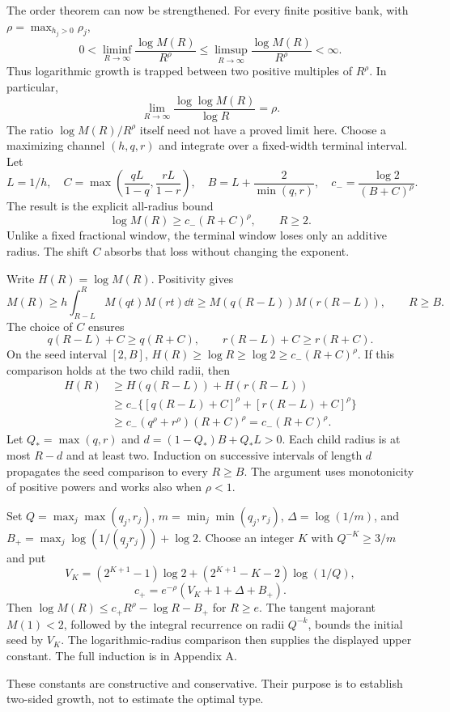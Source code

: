 The order theorem can now be strengthened. For every finite positive bank,
with $\rho=\max_{h_j>0}\rho_j$,
\[
\boxed{0<\liminf_{R\to\infty}\frac{\log M(R)}{R^\rho}
\le\limsup_{R\to\infty}\frac{\log M(R)}{R^\rho}<\infty.}
\]
Thus logarithmic growth is trapped between two positive multiples of
$R^\rho$. In particular,
\[
\lim_{R\to\infty}\frac{\log\log M(R)}{\log R}=\rho.
\]
The ratio $\log M(R)/R^\rho$ itself need not have a proved limit here.
Choose a maximizing channel $(h,q,r)$ and integrate over a fixed-width
terminal interval. Let
\[
L=1/h,\quad C=\max\left(\frac{qL}{1-q},\frac{rL}{1-r}\right),\quad
B=L+\frac{2}{\min(q,r)},\quad c_-=\frac{\log2}{(B+C)^\rho}.
\]
The result is the explicit all-radius bound
\[
\log M(R)\ge c_-(R+C)^\rho,\qquad R\ge2.
\]
Unlike a fixed fractional window, the terminal window loses only an additive
radius. The shift $C$ absorbs that loss without changing the exponent.

Write $H(R)=\log M(R)$. Positivity gives
\[
M(R)\ge h\int_{R-L}^{R}M(qt)M(rt)\dd t
\ge M(q(R-L))M(r(R-L)),\qquad R\ge B.
\]
The choice of $C$ ensures
\[
q(R-L)+C\ge q(R+C),\qquad r(R-L)+C\ge r(R+C).
\]
On the seed interval $[2,B]$, $H(R)\ge\log R\ge\log2\ge c_-(R+C)^\rho$.
If this comparison holds at the two child radii, then
\[
\begin{aligned}
H(R)&\ge H(q(R-L))+H(r(R-L))\\
&\ge c_-\{[q(R-L)+C]^\rho+[r(R-L)+C]^\rho\}\\
&\ge c_-(q^\rho+r^\rho)(R+C)^\rho=c_-(R+C)^\rho.
\end{aligned}
\]
Let $Q_* =\max(q,r)$ and $d=(1-Q_*)B+Q_*L>0$. Each child radius is at
most $R-d$ and at least two. Induction on successive intervals of length
$d$ propagates the seed comparison to every $R\ge B$. The argument uses
monotonicity of positive powers and works also when $\rho<1$.

Set $Q=\max_j\max(q_j,r_j)$, $m=\min_j\min(q_j,r_j)$,
$\Delta=\log(1/m)$, and $B_+=\max_j\log(1/(q_jr_j))+\log2$.
Choose an integer $K$ with $Q^{-K}\ge3/m$ and put
\[
V_K=(2^{K+1}-1)\log2+(2^{K+1}-K-2)\log(1/Q),
\]
\[
c_+=e^{-\rho}(V_K+1+\Delta+B_+).
\]
Then $\log M(R)\le c_+R^\rho-\log R-B_+$ for $R\ge e$.
The tangent majorant $M(1)<2$, followed by the integral recurrence on radii
$Q^{-k}$, bounds the initial seed by $V_K$. The logarithmic-radius comparison
then supplies the displayed upper constant. The full induction is in Appendix A.

These constants are constructive and conservative. Their purpose is to
establish two-sided growth, not to estimate the optimal type.
